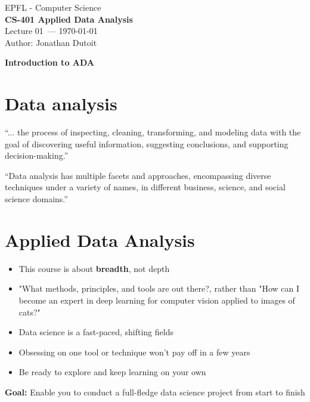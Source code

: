 \documentclass[11pt]{article}
\newcommand{\coursename}{CS-401 Applied Data Analysis}
\newcommand{\lecturenum}{01}
\newcommand{\lecturedate}{\today}
\begin{document}
\begin{center}
  {\large EPFL - Computer Science} \\[0.5em]
  {\Large \textbf{\coursename}} \\[0.5em]
  {\large Lecture \lecturenum\ --- \lecturedate} \\[0.5em]
  {\large Author: Jonathan Dutoit} \\
\end{center}

\vspace{2cm}

\begin{center}
  {\LARGE \textbf{Introduction to ADA}}
\end{center}

\vspace{1cm}

\section*{Data analysis}
“... the process of inspecting, cleaning, transforming, and modeling data with the goal of discovering useful information, suggesting conclusions, and supporting decision-making.”

“Data analysis has multiple facets and approaches, encompassing diverse techniques under a variety of names, in different business, science, and social science domains.”

\section*{Applied Data Analysis}
\begin{itemize}
	\item This course is about \textbf{breadth}, not depth
	\item "What methods, principles, and tools are out there?, rather than "How can I become an expert in deep learning for computer vision applied to images of cats?"
	\item Data science is a fast-paced, shifting fields
	\item Obsessing on one tool or technique won't pay off in a few years
	\item Be ready to explore and keep learning on your own
\end{itemize}

\textbf{Goal:} Enable you to conduct a full-fledge data science project from start to finish
\end{document}
